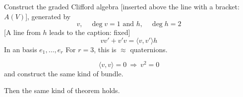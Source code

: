 Construct the graded Clifford algebra [inserted above the line with a bracket: $A(V)$],
generated by
\begin{equation*}
v,\quad\operatorname{deg}v=1\text{ and }h,\quad\operatorname{deg}h=2
\end{equation*}
[A line from $h$ leads to the caption: fixed]
\begin{equation*}
vv'+v'v=\langle v,v'\rangle h
\end{equation*}
In an 
basis $e_1,\ldots,e_r$
For $r=3$, this is $\approx$ quaternions.

\begin{equation*}
\langle v,v\rangle=0\ \Rightarrow\ v^2=0
\end{equation*}
and construct the same kind of bundle.

Then the same kind of theorem holds.

